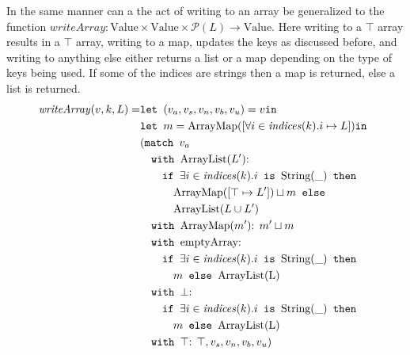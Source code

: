 In the same manner can a the act of writing to an array be generalized to the function $\mathit{writeArray}: \text{Value} \times \text{Value} \times \mathcal{P}(L) \rightarrow \text{Value}$. Here writing to a $\top$ array results in a $\top$ array, writing to a map, updates the keys as discussed before, and writing to anything else either returns a list or a map depending on the type of keys being used. If some of the indices are strings then a map is returned, else a list is returned. 
\begin{align}
\mathit{writeArray}(v, k, L) =       & \texttt{let } (v_a,v_s,v_n,v_b,v_u) = v \texttt{in }\notag\\
                            &\texttt{let } m = \text{ArrayMap}([\forall i \in \mathit{indices}(k). i \mapsto L]) \texttt{in }\notag\\
                            &(\texttt{match }v_a \notag\\
                            & \quad \texttt{with }\text{ArrayList}(L')\text{: } \notag\\
                            &\quad\quad \texttt{if }\exists i \in \mathit{indices}(k).i \texttt{ is } \text{String}(\_)\texttt{ then } \notag\\
                            &\quad\quad\quad \text{ArrayMap}([\top \mapsto L'])\sqcup m \texttt{ else } \notag\\
                            &\quad\quad\quad \text{ArrayList}(L\cup L')\notag\\
                            & \quad \texttt{with }\text{ArrayMap}(m')\text{: } m'\sqcup m\notag\\
                            & \quad \texttt{with }\text{emptyArray}\text{: } \notag\\
                            & \quad\quad\texttt{if }\exists i \in \mathit{indices}(k).i \texttt{ is } \text{String}(\_)\texttt{ then } \notag\\
                            &\quad\quad\quad m \texttt{ else } \text{ArrayList(L)}\notag\\
                            & \quad \texttt{with }\bot\text{: }  \notag\\
                            & \quad\quad\texttt{if }\exists i \in \mathit{indices}(k).i \texttt{ is } \text{String}(\_)\texttt{ then } \notag\\
                            &\quad\quad\quad m \texttt{ else } \text{ArrayList(L)}\notag\\
                            & \quad \texttt{with }\top\text{: } \top, v_s, v_n, v_b, v_u)
\end{align}

